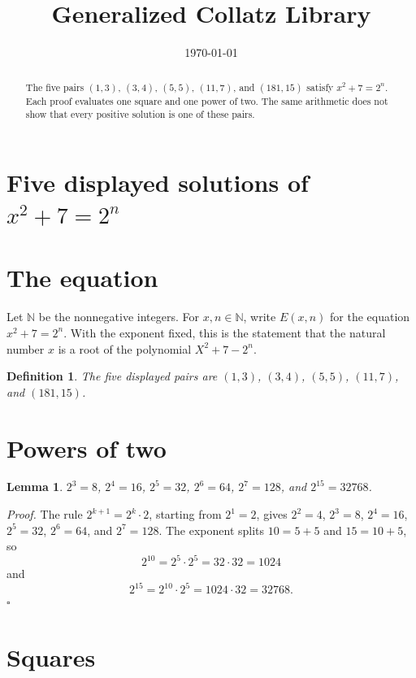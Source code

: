 \documentclass[11pt,letterpaper]{article}
\title{Generalized Collatz Library}
\author{}
\date{\today}
\newcommand{\N}{\mathbb{N}}
\newtheorem{lemma}[theorem]{Lemma}
\newtheorem{definition}[theorem]{Definition}
\newenvironment{proof}{\noindent\textit{Proof.}}{\hfill\(\square\)}
\begin{document}
\maketitle
\section*{Five displayed solutions of \(x^{2}+7=2^{n}\)}

\begin{abstract}
The five pairs \((1,3)\), \((3,4)\), \((5,5)\), \((11,7)\), and \((181,15)\) satisfy \(x^{2}+7=2^{n}\). Each proof evaluates one square and one power of two. The same arithmetic does not show that every positive solution is one of these pairs.
\end{abstract}

\section{The equation}

Let \(\N\) be the nonnegative integers. For \(x,n\in\N\), write \(E(x,n)\) for the equation \(x^{2}+7=2^{n}\). With the exponent fixed, this is the statement that the natural number \(x\) is a root of the polynomial \(X^{2}+7-2^{n}\).

\begin{definition}
The five displayed pairs are $(1,3)$, $(3,4)$, $(5,5)$, $(11,7)$, and $(181,15)$.
\end{definition}

\section{Powers of two}

\begin{lemma}
\label{lem:powers}
\(2^{3}=8\), \(2^{4}=16\), \(2^{5}=32\), \(2^{6}=64\), \(2^{7}=128\), and \(2^{15}=32768\).
\end{lemma}

\begin{proof}
The rule \(2^{k+1}=2^{k}\cdot 2\), starting from \(2^{1}=2\), gives \(2^{2}=4\), \(2^{3}=8\), \(2^{4}=16\), \(2^{5}=32\), \(2^{6}=64\), and \(2^{7}=128\). The exponent splits \(10=5+5\) and \(15=10+5\), so
\[
2^{10}=2^{5}\cdot 2^{5}=32\cdot 32=1024
\]
and
\[
2^{15}=2^{10}\cdot 2^{5}=1024\cdot 32=32768.
\]
\end{proof}

\section{Squares}
\end{document}
